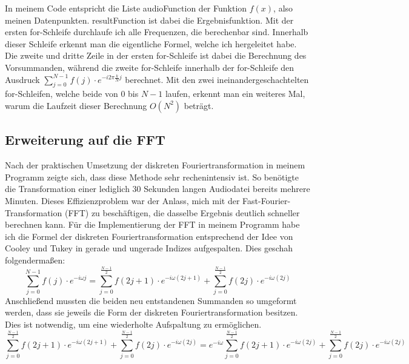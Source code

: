 \documentclass[a4paper,12pt]{article}
\theoremstyle{definition}
\theoremstyle{remark}
\begin{document}
In meinem Code entspricht die Liste audioFunction der Funktion $f(x)$, also meinen Datenpunkten. resultFunction ist dabei 
die Ergebnisfunktion. Mit der ersten for-Schleife durchlaufe ich alle Frequenzen, die berechenbar sind. 
Innerhalb dieser Schleife erkennt man die eigentliche Formel, welche ich hergeleitet habe. Die zweite 
und dritte Zeile in der ersten for-Schleife ist dabei die Berechnung des Vorsummanden, während die zweite 
for-Schleife innerhalb der for-Schleife den Ausdruck $\sum_{j=0}^{N-1} f(j) \cdot e^{-i 2 \pi \frac{k}{N} j}$ 
berechnet. Mit den zwei ineinandergeschachtelten for-Schleifen, welche beide von $0$ bis $N-1$ laufen, 
erkennt man ein weiteres Mal, warum die Laufzeit dieser Berechnung $O(N^2)$ beträgt.  

\subsection{Erweiterung auf die FFT}
Nach der praktischen Umsetzung der diskreten Fouriertransformation in meinem Programm zeigte sich, dass diese Methode 
sehr rechenintensiv ist. So benötigte die Transformation einer lediglich 30 Sekunden langen Audiodatei bereits mehrere 
Minuten. Dieses Effizienzproblem war der Anlass, mich mit der Fast-Fourier-Transformation (FFT) zu beschäftigen, die dasselbe 
Ergebnis deutlich schneller berechnen kann. Für die Implementierung der FFT in meinem Programm habe ich die Formel der diskreten 
Fouriertransformation entsprechend der Idee von Cooley und Tukey in gerade und ungerade Indizes aufgespalten. Dies geschah 
folgendermaßen:
\[
\sum_{j=0}^{N-1}{f(j)\cdot e^{-i\omega j}} = \sum_{j=0}^{\frac{N-1}{2}}{f(2j+1)\cdot e^{-i \omega (2j+1)}} + \sum_{j=0}^{\frac{N-1}{2}}{f(2j)\cdot e^{-i \omega (2j)}}
\]
Anschließend mussten die beiden neu entstandenen Summanden so umgeformt werden, dass sie jeweils die Form der diskreten 
Fouriertransformation besitzen. Dies ist notwendig, um eine wiederholte Aufspaltung zu ermöglichen.
\[
\sum_{j=0}^{\frac{N-1}{2}}{f(2j+1)\cdot e^{-i \omega (2j+1)}} + \sum_{j=0}^{\frac{N-1}{2}}{f(2j)\cdot e^{-i \omega (2j)}} = e^{-i\omega}\sum_{j=0}^{\frac{N-1}{2}}{f(2j+1)\cdot e^{-i \omega (2j)}} + \sum_{j=0}^{\frac{N-1}{2}}{f(2j)\cdot e^{-i \omega (2j)}}
\]
\end{document}
